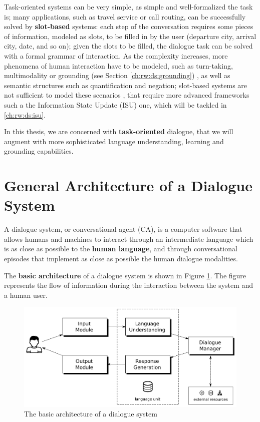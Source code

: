 Task-oriented systems can be very simple, as simple and well-formalized the task is;  many applications, such as travel service or call routing, can be successfully solved by \textbf{slot-based} systems: each step of the conversation requires some pieces of information, modeled as slots, to be filled in by the user (departure city, arrival city, date, and so on); given the slots to be filled, the dialogue task can be solved with a formal grammar of interaction. As the complexity increases, more phenomena of human interaction have to be modeled, such as turn-taking, multimodality or grounding (see Section \ref{ch:rw:ds:grounding})
, as well as semantic structures such as quantification and negation; slot-based systems are not sufficient to model these scenarios \citep{Gabsdil03clarificationin}, that require more advanced frameworks such a the Information State Update (ISU) one, which will be tackled in \ref{ch:rw:ds:isu}.

In this thesis, we are concerned with \textbf{task-oriented} dialogue, that we will augment with more sophisticated language understanding, learning and grounding capabilities.


\section{General Architecture of a Dialogue System} \label{ch:introduction:arch}
A dialogue system, or conversational agent (CA), is a computer software that allows humans and machines to interact through an intermediate language which is as close as possible to the \textbf{human language}, and through conversational episodes that implement as close as possible the human dialogue modalities.

The \textbf{basic architecture} of a dialogue system is shown in Figure \ref{ds_arch}. The figure represents the flow of information during the interaction between the system and a human user.

\begin{figure}
	\centering
	\includegraphics[width=15cm]{Pictures/ds_arch.pdf}
	\caption{The basic architecture of a dialogue system}
	\label{ds_arch}
\end{figure}
 
